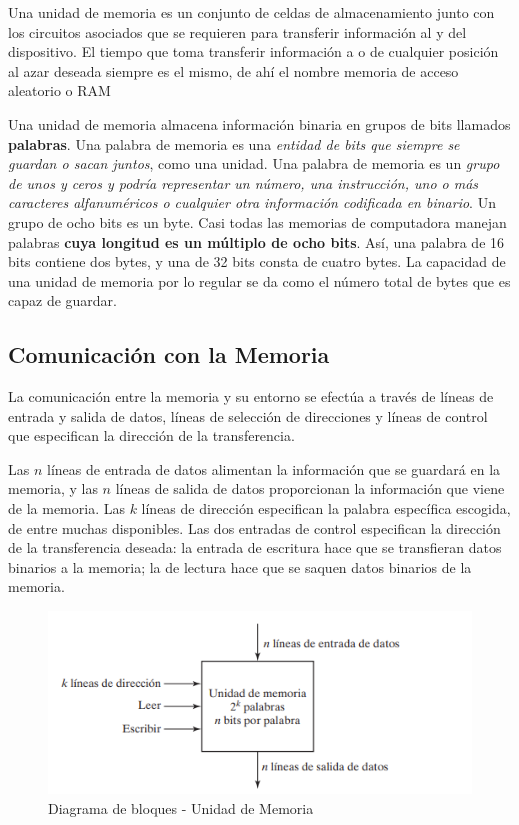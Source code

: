 Una unidad de memoria es un conjunto de celdas de almacenamiento junto con los circuitos asociados que se requieren para transferir información al y del dispositivo. El tiempo que toma transferir información a o de cualquier posición al azar deseada siempre es el mismo, de ahí el nombre memoria de acceso aleatorio o RAM

Una unidad de memoria almacena información binaria en grupos de bits llamados \textbf{palabras}. Una palabra de memoria es una \textit{entidad de bits que siempre se guardan o sacan juntos}, como una unidad. Una palabra de memoria es un \textit{grupo de unos y ceros y podría representar un número, una instrucción, uno o más caracteres alfanuméricos o cualquier otra información codificada en binario}. Un grupo de ocho bits es un byte. Casi todas las memorias de computadora manejan palabras \textbf{cuya longitud es un múltiplo de ocho bits}. Así, una palabra de 16 bits contiene dos bytes, y una de 32 bits consta de cuatro bytes. La capacidad de una unidad de memoria por lo regular se da como el número total de bytes que es capaz de guardar.

\subsection{Comunicación con la Memoria}
La comunicación entre la memoria y su entorno se efectúa a través de líneas de entrada y salida de datos, líneas de selección de direcciones y líneas de control que especifican la dirección de la transferencia.

Las $n$ líneas de entrada de datos alimentan la información que se guardará en la memoria, y las $n$ líneas de salida de datos proporcionan la información que viene de la memoria. Las $k$ líneas de dirección especifican la palabra específica escogida, de entre muchas disponibles. Las dos entradas de control especifican la dirección de la transferencia deseada: la entrada de escritura hace que se transfieran datos binarios a la memoria; la de lectura hace que se saquen datos binarios de la memoria.

\begin{figure}[h]
\centering
\includegraphics[scale=0.95]{img/mem.png}
\caption{Diagrama de bloques - Unidad de Memoria}
\end{figure}

